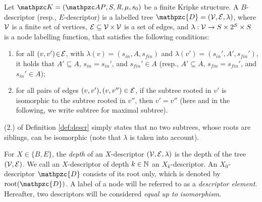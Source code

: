 \begin{definition} \label{def:descr}
Let $\Ku=\KuDef$ be a finite Kripke structure. 
A $B$-descriptor (resp., $E$-descriptor) is a labelled tree $\mathpzc{D}=(\DV,\DE,\lambda)$, where $\operatorname{\mathcal{V}}$ is a finite set of vertices, $\operatorname{\mathcal{E}}\subseteq \operatorname{\mathcal{V}}\times \operatorname{\mathcal{V}}$ is a set of edges, and $\lambda:\operatorname{\mathcal{V}}\to S\times 2^S\times S$ is a node labelling function, that satisfies the following conditions:
    \begin{enumerate}
        \item for all $(v,v')\!\in\! \operatorname{\mathcal{E}}$, with $\lambda(v)\!=\!(s_{in},A,s_{fin})$ and $\lambda(v')\! =\! (s_{in}',A', s_{fin}')$, it holds that $A'\subseteq A$, $s_{in}=s_{in}'$, and $s_{fin}'\in A$
            (resp., $A'\subseteq A$, $s_{fin}=s_{fin}'$, and $s_{in}'\in A$);
        \item for all pairs of edges $(v,v'), (v,v'')\in \operatorname{\mathcal{E}}$, 
        if the subtree rooted in $v'$ is isomorphic to the subtree rooted in $v''$, then $v'=v''$
        (here and in the following, we write subtree for maximal subtree).
    \end{enumerate}
\end{definition}
(2.) of Definition \ref{def:descr} simply states that no two subtrees, whose roots are siblings, 
can be isomorphic (note that $\lambda$ is taken into account).

For $X\in\{B,E\}$, the \emph{depth} of an $X$-descriptor $(\operatorname{\mathcal{V}},\operatorname{\mathcal{E}},\lambda)$ is the depth of the tree $(\operatorname{\mathcal{V}},\operatorname{\mathcal{E}})$. We call an $X$-descriptor of depth $k\in\mathbb{N}$ an $X_k$-descriptor. An $X_0$-descriptor $\mathpzc{D}$ consists of its root only, which is denoted by $\Root(\mathpzc{D})$. 
A label of a node will be referred to as a \emph{descriptor element}.
%
Hereafter, two descriptors will be considered \emph{equal up to isomorphism}. 

